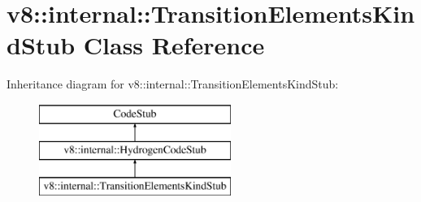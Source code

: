 \hypertarget{classv8_1_1internal_1_1_transition_elements_kind_stub}{}\section{v8\+:\+:internal\+:\+:Transition\+Elements\+Kind\+Stub Class Reference}
\label{classv8_1_1internal_1_1_transition_elements_kind_stub}
Inheritance diagram for v8\+:\+:internal\+:\+:Transition\+Elements\+Kind\+Stub\+:\begin{figure}[H]
\begin{center}
\leavevmode
\includegraphics[height=3.000000cm]{classv8_1_1internal_1_1_transition_elements_kind_stub}
\end{center}
\end{figure}

